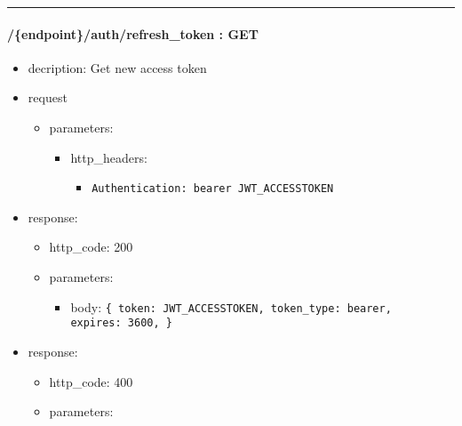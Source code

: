 \documentclass[
]{article}
\begin{document}
\begin{center}\rule{0.5\linewidth}{0.5pt}\end{center}

\hypertarget{header-n60961}{%
\paragraph{/\{endpoint\}/auth/refresh\_token :
GET}\label{header-n60961}}

\begin{itemize}
\item
  decription: Get new access token
\item
  request

  \begin{itemize}
  \item
    parameters:

    \begin{itemize}
    \item
      http\_headers:

      \begin{itemize}
      \item
        \texttt{Authentication:\ \textquotesingle{}bearer\ JWT\_ACCESSTOKEN\textquotesingle{}}
      \end{itemize}
    \end{itemize}
  \end{itemize}
\item
  response:

  \begin{itemize}
  \item
    http\_code: 200
  \item
    parameters:

    \begin{itemize}
    \item
      body: \texttt{\{
      \textquotesingle{}token\textquotesingle{}:\ \textquotesingle{}JWT\_ACCESSTOKEN\textquotesingle{},
      \textquotesingle{}token\_type\textquotesingle{}:\ \textquotesingle{}bearer\textquotesingle{},
      \textquotesingle{}expires\textquotesingle{}:\ 3600,
      \}}
    \end{itemize}
  \end{itemize}
\item
  response:

  \begin{itemize}
  \item
    http\_code: 400
  \item
    parameters:


\end{itemize}
\end{itemize}
\end{document}
